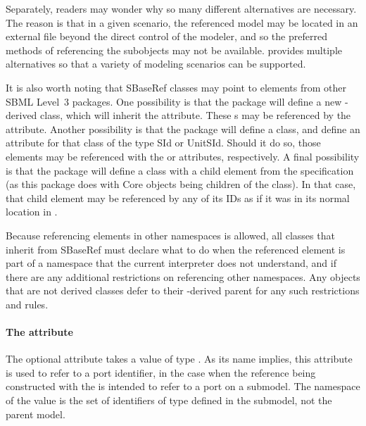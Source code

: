 Separately, readers may wonder why so many different alternatives are
necessary.  The reason is that in a given scenario, the referenced model
may be located in an external file beyond the direct control of the
modeler, and so the preferred methods of referencing the subobjects may
not be available.  \SBaseRef provides multiple alternatives so that a
variety of modeling scenarios can be supported.

It is also worth noting that SBaseRef classes may point to elements
from other SBML Level~3 packages.  One possibility is that the package
will define a new \SBase-derived class, which will inherit the 
attribute.  These s may be referenced by the \SBaseRef {}
attribute.  Another possibility is that the package will define a class,
and define an attribute for that class of the type SId or UnitSId.  Should
it do so, those elements may be referenced with the  or 
attributes, respectively.  A final possibility is that the package will 
define a class with a child element from the \sbmlthreecore specification (as this 
package does with Core \Model objects being children of the 
\ListOfModelDefinitions class).  In that case, that child element may be 
referenced by any of its IDs as if it was in its normal location in \sbmlthreecore.

Because referencing elements in other namespaces is allowed, all classes that
inherit from SBaseRef must declare what to do when the referenced element
is part of a namespace that the current interpreter does not understand, and
if there are any additional restrictions on referencing other namespaces.  Any
\SBaseRef objects that are not derived classes defer to their \SBaseRef-derived
parent for any such restrictions and rules.


\paragraph{The \fixttspace{} attribute}
\label{sbaseref-portref}

The optional attribute  takes a value of type
.  As its name implies, this attribute is used to
refer to a port identifier, in the case when the reference being
constructed with the \SBaseRef is intended to refer to a port on a
submodel.  The namespace of the  value is the set
of identifiers of type  defined in the submodel, not
the parent model.


